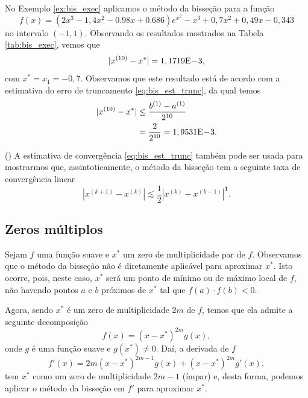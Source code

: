 \begin{ex}\label{ex:bis_conv}
  No Exemplo \ref{ex:bis_exec} aplicamos o método da bisseção para a função
  \begin{equation}
        f(x) = (2x^3-1,4x^2-0.98x+0.686)e^{x^2} - x^3 + 0,7x^2 + 0,49x - 0,343
  \end{equation}
no intervalo $(-1, 1)$. Observando os resultados mostrados na Tabela \ref{tab:bis_exec}, vemos que
\begin{equation}
  |x^{(10)}-x^*| = 1,1719\mathrm{E}\!-\!3,
\end{equation}
com $x^* = x_1 = -0,7$. Observamos que este resultado está de acordo com a estimativa do erro de truncamento \eqref{eq:bis_est_trunc}, da qual temos
\begin{align}
  |x^{(10)} - x^*| &\leq \frac{b^{(1)}-a^{(1)}}{2^{10}}\\
  &= \frac{2}{2^{10}} = 1,9531\mathrm{E}\!-\!3.
\end{align}
\end{ex}

\begin{obs}()
  A estimativa de convergência \eqref{eq:bis_est_trunc} também pode ser usada para mostrarmos que, assintoticamente, o método da bisseção tem a seguinte taxa de convergência linear
  \begin{equation}
    \left|x^{(k+1)} - x^{(k)}\right| \lesssim \frac{1}{2}\left|x^{(k)} - x^{(k-1)}\right|^{\pmb{1}}.
  \end{equation}
\end{obs}

\subsection{Zeros múltiplos}

Sejam $f$ uma função suave e $x^*$ um zero de multiplicidade par de $f$. Observamos que o método da bisseção não é diretamente aplicável para aproximar $x^*$. Isto ocorre, pois, neste caso, $x^*$ será um ponto de mínimo ou de máximo local de $f$, não havendo pontos $a$ e $b$ próximos de $x^*$ tal que $f(a)\cdot f(b) < 0$.

Agora, sendo $x^*$ é um zero de multiplicidade $2m$ de $f$, temos que ela admite a seguinte decomposição
\begin{equation}
  f(x) = (x-x^*)^{2m}g(x),
\end{equation}
onde $g$ é uma função suave e $g(x^*)\neq 0$. Daí, a derivada de $f$
\begin{equation}
  f'(x) = 2m(x-x^*)^{2m-1}g(x) + (x-x^*)^{2m}g'(x),
\end{equation}
tem $x^*$ como um zero de multiplicidade $2m-1$ (ímpar) e, desta forma, podemos aplicar o método da bisseção em $f'$ para aproximar $x^*$.

